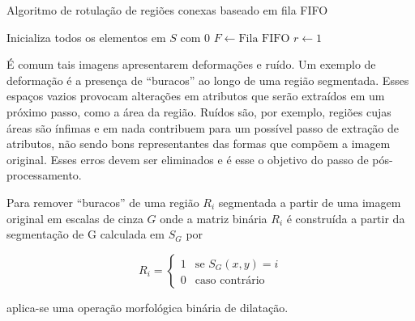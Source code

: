 \begin{espacosimples}
\begin{algorithm2e}[H]
  \caption{Algoritmo de rotulação de regiões conexas baseado em fila FIFO}
  \label{algo:conexo}
  \SetAlgoLined

  Inicializa todos os elementos em $S$ com $0$\;
  $F \gets \text{Fila FIFO}$\;
  $r \gets 1$\;


\end{algorithm2e}
\end{espacosimples}

\vspace{1.0cm}

É comum tais imagens apresentarem deformações e ruído. Um exemplo de
deformação é a presença de ``buracos'' ao longo de uma região
segmentada. Esses espaços vazios provocam alterações em atributos que
serão extraídos em um próximo passo, como a área da região. Ruídos
são, por exemplo, regiões cujas áreas são ínfimas e em nada contribuem
para um possível passo de extração de atributos, não sendo bons
representantes das formas que compõem a imagem original. Esses erros
devem ser eliminados e é esse o objetivo do passo de
pós-processamento.

Para remover ``buracos'' de uma região $R_i$ segmentada a partir de
uma imagem original em escalas de cinza $G$ onde a matriz binária
$R_i$ é construída a partir da segmentação de G calculada em $S_G$ por

\begin{equation}
  R_i = 
  \begin{cases}
    1 & \text{se $S_G(x,y) = i$} \\
    0 & \text{caso contrário}
  \end{cases}
\end{equation}

\noindent aplica-se uma operação morfológica binária de dilatação.


